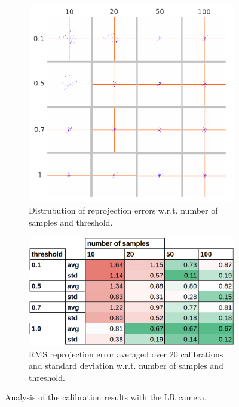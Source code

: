 \begin{figure}[H]
  \centering
  \begin{subfigure}{.5\textwidth}
    \centering
    \includegraphics[width=.8\linewidth]{figures/reprj_dist_LR.png}
    \caption{Distrubution of reprojection errors w.r.t. \newline number of samples and threshold.}
    \label{fig:reprj_dist_LR}
  \end{subfigure}%
  \begin{subfigure}{.5\textwidth}
    \centering
    \includegraphics[width=0.8\linewidth]{figures/calib_results_table_LR.png}
    \caption{RMS reprojection error averaged over 20 calibrations and standard deviation w.r.t. number of samples and threshold.}
    \label{fig:calib_stats_LR}
  \end{subfigure}
  \caption{Analysis of the calibration results with the LR camera.}
  \label{fig:calib_analysis_LR}
\end{figure}

